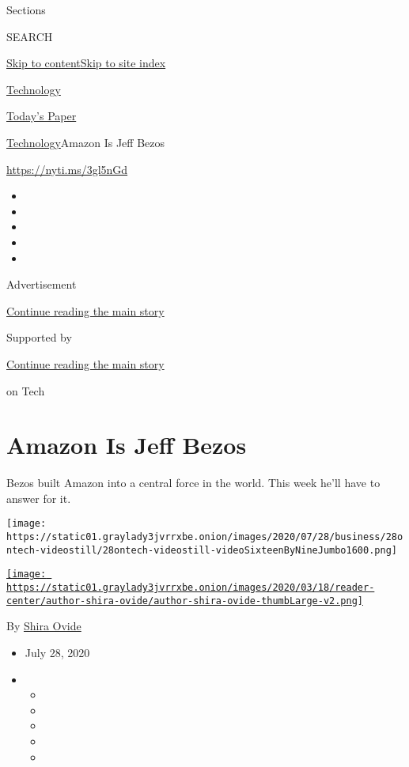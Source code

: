Sections

SEARCH

\protect\hyperlink{site-content}{Skip to
content}\protect\hyperlink{site-index}{Skip to site index}

\href{https://www.nytimes3xbfgragh.onion/section/technology}{Technology}

\href{https://myaccount.nytimes3xbfgragh.onion/auth/login?response_type=cookie\&client_id=vi}{}

\href{https://www.nytimes3xbfgragh.onion/section/todayspaper}{Today's
Paper}

\href{/section/technology}{Technology}\textbar{}Amazon Is Jeff Bezos

\url{https://nyti.ms/3gl5nGd}

\begin{itemize}
\item
\item
\item
\item
\item
\end{itemize}

Advertisement

\protect\hyperlink{after-top}{Continue reading the main story}

Supported by

\protect\hyperlink{after-sponsor}{Continue reading the main story}

on Tech

\hypertarget{amazon-is-jeff-bezos}{%
\section{Amazon Is Jeff Bezos}\label{amazon-is-jeff-bezos}}

Bezos built Amazon into a central force in the world. This week he'll
have to answer for it.

\texttt{[image: https://static01.graylady3jvrrxbe.onion/images/2020/07/28/business/28ontech-videostill/28ontech-videostill-videoSixteenByNineJumbo1600.png]}

\href{https://www.nytimes3xbfgragh.onion/by/shira-ovide}{\texttt{[image: https://static01.graylady3jvrrxbe.onion/images/2020/03/18/reader-center/author-shira-ovide/author-shira-ovide-thumbLarge-v2.png]}}

By \href{https://www.nytimes3xbfgragh.onion/by/shira-ovide}{Shira Ovide}

\begin{itemize}
\item
  July 28, 2020
\item
  \begin{itemize}
  \item
  \item
  \item
  \item
  \item
  \end{itemize}
\end{itemize}

